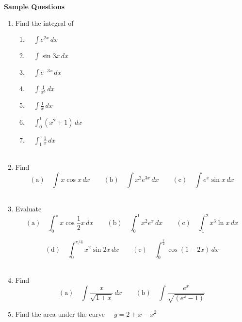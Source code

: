 \documentclass[11pt,a4paper]{article}
\theoremstyle{definition}
\begin{document}
\textbf{Sample Questions}
\begin{enumerate}
\item Find the integral of 
\begin{enumerate}
       \item $\quad \displaystyle{\int e^{2x}\,dx}$\\
       
       \item $\quad \displaystyle{\int \sin 3x\,dx}$\\
       
       \item $\quad \displaystyle{\int e^{-3x}\,dx}$\\
       
       \item $\quad \displaystyle{\int \frac{1}{x^5}\,dx}$\\
       
       \item $\quad \displaystyle{\int \frac{1}{x}\,dx}$\\
       
       \item $\quad \displaystyle{\int^1_0\left(x^2 + 1\right)\,dx}$\\
       
       \item $\quad \displaystyle{\int^e_1\frac{1}{x}\,dx}$\\\\
\end{enumerate}




\item Find 
$$(\text{a})\quad  \int x\cos x \,dx\qquad  (\text{b})\quad  \int x^2e^{3x}\,dx\qquad  (\text{c})\quad  \int e^x\sin x \,dx$$\\

\item Evaluate
$$(\text{a})\quad  \int^{\pi}_0 x \cos \frac{1}{2}x\,dx \qquad  (\text{b})\quad  \int^1_0x^2e^{x}\,dx\qquad  (\text{c})\quad  \int^2_1x^3\ln x \,dx$$

$$(\text{d})\quad  \int^{\pi/4}_0x^2\sin 2x\, dx\qquad  (\text{e})\quad  \int^{\frac{\pi}{2}}_0\cos \left(1- 2x\right)\,dx$$\\


\item Find
$$(\text{a})\quad  \int \frac{x}{\sqrt{1 + x}}\,dx \qquad  (\text{b})\quad  \int \frac{e^x}{\sqrt{\left(e^x - 1\right)}}$$


\item Find the area under the curve $\quad  y = 2 + x - x^2$


\end{enumerate}
\end{document}
